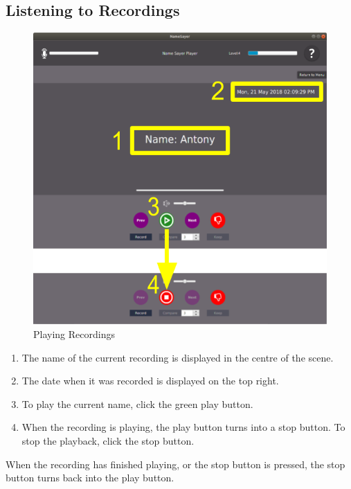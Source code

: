 \documentclass[a4paper,12pt]{article}
\begin{document}
\subsection{Listening to Recordings}
\begin{figure}[!h]
	\includegraphics[width=\linewidth]{listen.png}
	\caption{Playing Recordings}
\end{figure}
\begin{enumerate}[label=\textbf{\arabic*}]
	\item The name of the current recording is displayed in the centre of the scene.
	
	\item The date when it was recorded is displayed on the top right.
	
	\item To play the current name, click the green play button. 
	
	\item When the recording is playing, the play button turns into a stop button. To stop the playback, click the stop button.
	
\end{enumerate}
When the recording has finished playing, or the stop button is pressed, the stop button turns back into the play button.
\\
\end{document}
